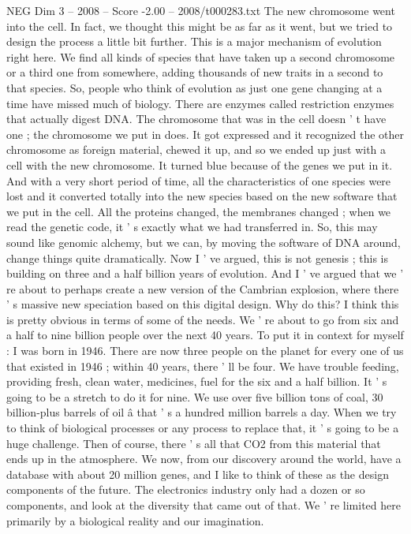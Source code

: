 \begin{textsample}{NEG Dim 3 – 2008 – Score -2.00 – 2008/t000283.txt}
The new chromosome went into the cell.
In fact, we thought this might be as far as it went, but we tried to design the process a little bit further.
This is a major mechanism of evolution right here.
We find all kinds of species that have taken up a second chromosome or a third one from somewhere, adding thousands of new traits in a second to that species.
So, people who think of evolution as just one gene changing at a time have missed much of biology.
There are enzymes called restriction enzymes that actually digest DNA.
The chromosome that was in the cell doesn ' t have one ; the chromosome we put in does.
It got expressed and it recognized the other chromosome as foreign material, chewed it up, and so we ended up just with a cell with the new chromosome.
It turned blue because of the genes we put in it.
And with a very short period of time, all the characteristics of one species were lost and it converted totally into the new species based on the new software that we put in the cell.
All the proteins changed, the membranes changed ; when we read the genetic code, it ' s exactly what we had transferred in.
So, this may sound like genomic alchemy, but we can, by moving the software of DNA around, change things quite dramatically.
Now I ' ve argued, this is not genesis ; this is building on three and a half billion years of evolution.
And I ' ve argued that we ' re about to perhaps create a new version of the Cambrian explosion, where there ' s massive new speciation based on this digital design.
Why do this?
I think this is pretty obvious in terms of some of the needs.
We ' re about to go from six and a half to nine billion people over the next 40 years.
To put it in context for myself : I was born in 1946.
There are now three people on the planet for every one of us that existed in 1946 ; within 40 years, there ' ll be four.
We have trouble feeding, providing fresh, clean water, medicines, fuel for the six and a half billion.
It ' s going to be a stretch to do it for nine.
We use over five billion tons of coal, 30 billion-plus barrels of oil â that ' s a hundred million barrels a day.
When we try to think of biological processes or any process to replace that, it ' s going to be a huge challenge.
Then of course, there ' s all that CO2 from this material that ends up in the atmosphere.
We now, from our discovery around the world, have a database with about 20 million genes, and I like to think of these as the design components of the future.
The electronics industry only had a dozen or so components, and look at the diversity that came out of that.
We ' re limited here primarily by a biological reality and our imagination.

\end{textsample}
